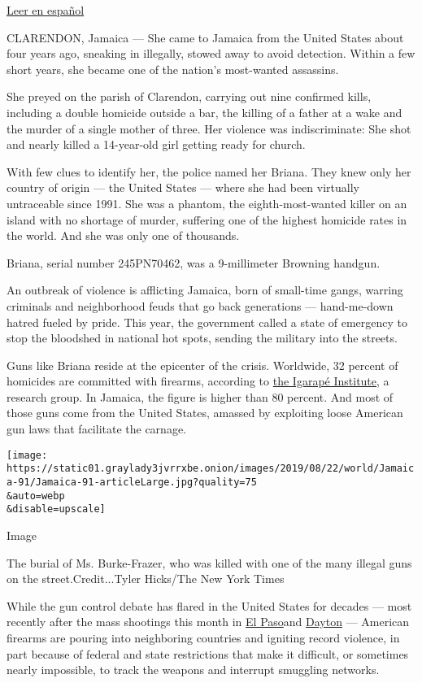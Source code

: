 \href{https://www.nytimes3xbfgragh.onion/es/2019/08/26/espanol/america-latina/jamaica-violencia-armas.html}{Leer
en español}

CLARENDON, Jamaica --- She came to Jamaica from the United States about
four years ago, sneaking in illegally, stowed away to avoid detection.
Within a few short years, she became one of the nation's most-wanted
assassins.

She preyed on the parish of Clarendon, carrying out nine confirmed
kills, including a double homicide outside a bar, the killing of a
father at a wake and the murder of a single mother of three. Her
violence was indiscriminate: She shot and nearly killed a 14-year-old
girl getting ready for church.

With few clues to identify her, the police named her Briana. They knew
only her country of origin --- the United States --- where she had been
virtually untraceable since 1991. She was a phantom, the
eighth-most-wanted killer on an island with no shortage of murder,
suffering one of the highest homicide rates in the world. And she was
only one of thousands.

Briana, serial number 245PN70462, was a 9-millimeter Browning handgun.

An outbreak of violence is afflicting Jamaica, born of small-time gangs,
warring criminals and neighborhood feuds that go back generations ---
hand-me-down hatred fueled by pride. This year, the government called a
state of emergency to stop the bloodshed in national hot spots, sending
the military into the streets.

Guns like Briana reside at the epicenter of the crisis. Worldwide, 32
percent of homicides are committed with firearms, according to
\href{https://igarape.org.br/en/apps/homicide-monitor/}{the Igarapé
Institute}, a research group. In Jamaica, the figure is higher than 80
percent. And most of those guns come from the United States, amassed by
exploiting loose American gun laws that facilitate the carnage.

\texttt{[image: https://static01.graylady3jvrrxbe.onion/images/2019/08/22/world/Jamaica-91/Jamaica-91-articleLarge.jpg?quality=75\\\&auto=webp\\\&disable=upscale]}

Image

The burial of Ms. Burke-Frazer, who was killed with one of the many
illegal guns on the street.Credit...Tyler Hicks/The New York Times

While the gun control debate has flared in the United States for decades
--- most recently after the mass shootings this month in
\href{https://www.nytimes3xbfgragh.onion/2019/08/03/us/el-paso-shooting.html?module=inline}{El
Paso}and
\href{https://www.nytimes3xbfgragh.onion/2019/08/04/us/dayton-ohio-shooting.html}{Dayton}
--- American firearms are pouring into neighboring countries and
igniting record violence, in part because of federal and state
restrictions that make it difficult, or sometimes nearly impossible, to
track the weapons and interrupt smuggling networks.

